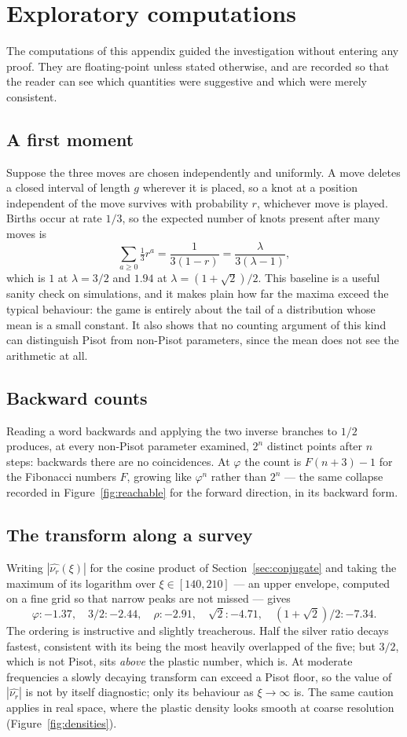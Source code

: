 \documentclass[11pt,reqno]{amsart}
\theoremstyle{plain}
\theoremstyle{definition}
\theoremstyle{remark}
\begin{document}
\section{Exploratory computations}\label{app:explore}

The computations of this appendix guided the investigation without entering
any proof. They are floating-point unless stated otherwise, and are recorded
so that the reader can see which quantities were suggestive and which were
merely consistent.

\subsection{A first moment}
Suppose the three moves are chosen independently and uniformly. A move deletes
a closed interval of length $g$ wherever it is placed, so a knot at a position
independent of the move survives with probability $r$, whichever move is
played. Births occur at rate $1/3$, so the expected number of knots present
after many moves is
\[
  \sum_{a\geq0}\tfrac13r^a=\frac{1}{3(1-r)}=\frac{\lambda}{3(\lambda-1)} ,
\]
which is $1$ at $\lambda=3/2$ and $1.94$ at $\lambda=(1+\sqrt2)/2$. This
baseline is a useful sanity check on simulations, and it makes plain how far
the maxima exceed the typical behaviour: the game is entirely about the tail
of a distribution whose mean is a small constant. It also shows that no
counting argument of this kind can distinguish Pisot from non-Pisot
parameters, since the mean does not see the arithmetic at all.

\subsection{Backward counts}
Reading a word backwards and applying the two inverse branches to $1/2$
produces, at every non-Pisot parameter examined, $2^n$ distinct points after
$n$ steps: backwards there are no coincidences. At $\varphi$ the count is
$F(n+3)-1$ for the Fibonacci numbers $F$, growing like $\varphi^n$ rather than
$2^n$ --- the same collapse recorded in Figure~\ref{fig:reachable} for the
forward direction, in its backward form.

\subsection{The transform along a survey}
Writing $|\widehat{\nu_r}(\xi)|$ for the cosine product of
Section~\ref{sec:conjugate} and taking the maximum of its logarithm over
$\xi\in[140,210]$ --- an upper envelope, computed on a fine grid so that
narrow peaks are not missed --- gives
\[
\varphi:-1.37,\quad 3/2:-2.44,\quad \rho:-2.91,\quad
\sqrt2:-4.71,\quad (1+\sqrt2)/2:-7.34 .
\]
The ordering is instructive and slightly treacherous. Half the silver ratio
decays fastest, consistent with its being the most heavily overlapped of the
five; but $3/2$, which is not Pisot, sits \emph{above} the plastic number,
which is. At moderate frequencies a slowly decaying transform can exceed a
Pisot floor, so the value of $|\widehat{\nu_r}|$ is not by itself diagnostic;
only its behaviour as $\xi\to\infty$ is. The same caution applies in real
space, where the plastic density looks smooth at coarse resolution
(Figure~\ref{fig:densities}).
\end{document}
